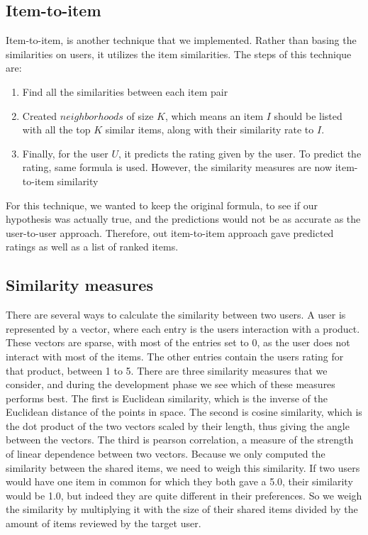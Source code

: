\documentclass[11pt]{article}
\begin{document}
\subsection{Item-to-item}
Item-to-item, is another technique that we implemented. Rather than basing the similarities on users, it utilizes the item similarities. The steps of this technique are:
\begin{enumerate}
	\item Find all the similarities between each item pair
	\item Created $neighborhoods$ of size $K$, which means an item $I$ should be listed with all the top $K$ similar items, along with their similarity rate to $I$.
	\item Finally, for the user $U$, it predicts the rating given by the user. To predict the rating, same formula is used. However, the similarity measures are now item-to-item similarity
\end{enumerate}
For this technique, we wanted to keep the original formula, to see if our hypothesis was actually true, and the predictions would not be as accurate as the user-to-user approach. Therefore, out item-to-item approach gave predicted ratings as well as a list of ranked items.


\subsection{Similarity measures}
There are several ways to calculate the similarity between two users. A user is represented by a vector, where each entry is the users interaction with a product. These vectors are sparse, with most of the entries set to 0, as the user does not interact with most of the items. The other entries contain the users rating for that product, between 1 to 5. There are three similarity measures that we consider, and during the development phase we see which of these measures performs best. The first is Euclidean similarity, which is the inverse of the Euclidean distance of the points in space. The second is cosine similarity, which is the dot product of the two vectors scaled by their length, thus giving the angle between the vectors. The third is pearson correlation, a measure of the strength of linear dependence between two vectors. Because we only computed the similarity between the shared items, we need to weigh this similarity. If two users would have one item in common for which they both gave a 5.0, their similarity would be 1.0, but indeed they are quite different in their preferences. So we weigh the similarity by multiplying it with the size of their shared items divided by the amount of items reviewed by the target user.
\end{document}

